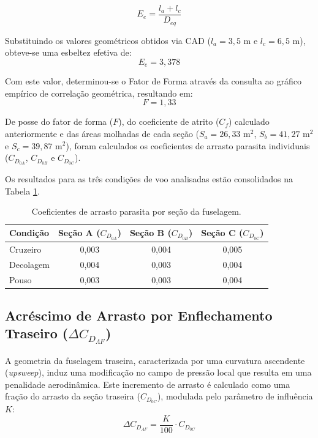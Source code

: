 \begin{equation}
    E_e = \frac{l_a + l_c}{D_{eq}}
\end{equation}

Substituindo os valores geométricos obtidos via CAD ($l_a = 3,5$ m e $l_c = 6,5$ m), obteve-se uma esbeltez efetiva de:
\begin{equation}
    E_e = 3,378
\end{equation}

Com este valor, determinou-se o Fator de Forma através da consulta ao gráfico empírico de correlação geométrica, resultando em:
\begin{equation}
    F = 1,33
\end{equation}

De posse do fator de forma ($F$), do coeficiente de atrito ($C_f$) calculado anteriormente e das áreas molhadas de cada seção ($S_a = 26,33 \text{ m}^2$, $S_b = 41,27 \text{ m}^2$ e $S_c = 39,87 \text{ m}^2$), foram calculados os coeficientes de arrasto parasita individuais ($C_{D_{0A}}$, $C_{D_{0B}}$ e $C_{D_{0C}}$).

Os resultados para as três condições de voo analisadas estão consolidados na Tabela \ref{tab:coef_arrasto_fuselagem}.

\begin{table}[H]
    \centering
    \caption{Coeficientes de arrasto parasita por seção da fuselagem.}
    \vspace{0.2cm}
    \begin{tabular}{lccc}
        \toprule
        \textbf{Condição} & \textbf{Seção A ($C_{D_{0A}}$)} & \textbf{Seção B ($C_{D_{0B}}$)} & \textbf{Seção C ($C_{D_{0C}}$)} \\
        \midrule
        Cruzeiro & 0,003 & 0,004 & 0,005 \\
        Decolagem & 0,004 & 0,003 & 0,004 \\
        Pouso & 0,003 & 0,003 & 0,004 \\
        \bottomrule
    \end{tabular}
    \label{tab:coef_arrasto_fuselagem}
\end{table}

\subsection{Acréscimo de Arrasto por Enflechamento Traseiro ($\Delta C_{D_{\Lambda F}}$)}

A geometria da fuselagem traseira, caracterizada por uma curvatura ascendente (\textit{upsweep}), induz uma modificação no campo de pressão local que resulta em uma penalidade aerodinâmica. Este incremento de arrasto é calculado como uma fração do arrasto da seção traseira ($C_{D_{0C}}$), modulada pelo parâmetro de influência $K$:
\begin{equation}
    \Delta C_{D_{\Lambda F}} = \frac{K}{100} \cdot C_{D_{0C}}
\end{equation}

